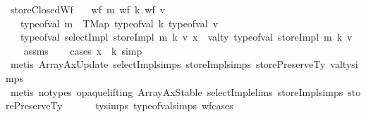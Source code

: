 \begin{isabellebody}
\endisatagproof
{\isafoldproof}%
%
\isadelimproof
\isanewline
%
\endisadelimproof
\isanewline
{}\isamarkupfalse%
\ storeClosedWf{}{\isacharcolon}{\kern0pt}\isanewline
\ \ \ {\isachardoublequoteopen}wf\ m{\isachardoublequoteclose}\ {\isachardoublequoteopen}wf\ k{\isachardoublequoteclose}\ {\isachardoublequoteopen}wf\ v{\isachardoublequoteclose}\isanewline
\ \ \ {\isachardoublequoteopen}type{\isacharunderscore}{\kern0pt}of{\isacharunderscore}{\kern0pt}val\ m\ {\isacharequal}{\kern0pt}\ TMap\ {\isacharparenleft}{\kern0pt}type{\isacharunderscore}{\kern0pt}of{\isacharunderscore}{\kern0pt}val\ k{\isacharparenright}{\kern0pt}\ {\isacharparenleft}{\kern0pt}type{\isacharunderscore}{\kern0pt}of{\isacharunderscore}{\kern0pt}val\ v{\isacharparenright}{\kern0pt}{\isachardoublequoteclose}\isanewline
\ \ \ {\isachardoublequoteopen}type{\isacharunderscore}{\kern0pt}of{\isacharunderscore}{\kern0pt}val\ {\isacharparenleft}{\kern0pt}selectImpl\ {\isacharparenleft}{\kern0pt}storeImpl\ m\ k\ v{\isacharparenright}{\kern0pt}\ x{\isacharparenright}{\kern0pt}\ {\isacharequal}{\kern0pt}\ val{\isacharunderscore}{\kern0pt}ty\ {\isacharparenleft}{\kern0pt}type{\isacharunderscore}{\kern0pt}of{\isacharunderscore}{\kern0pt}val\ {\isacharparenleft}{\kern0pt}storeImpl\ m\ k\ v{\isacharparenright}{\kern0pt}{\isacharparenright}{\kern0pt}{\isachardoublequoteclose}\isanewline
%
\isadelimproof
\ \ %
\endisadelimproof
%
\isatagproof
{}\isamarkupfalse%
\ assms\isanewline
\ \ \isamarkupfalse%
\ {\isacharparenleft}{\kern0pt}cases\ {\isachardoublequoteopen}x\ {\isacharequal}{\kern0pt}\ k{\isachardoublequoteclose}{\isacharsemicolon}{\kern0pt}\ simp{\isacharparenright}{\kern0pt}\isanewline
\ \ \ \isamarkupfalse%
\ {\isacharparenleft}{\kern0pt}metis\ ArrayAxUpdate\ selectImpl{\isachardot}{\kern0pt}simps\ storeImpl{\isachardot}{\kern0pt}simps\ storePreserveTy\ val{\isacharunderscore}{\kern0pt}ty{\isachardot}{\kern0pt}simps{\isacharparenleft}{\kern0pt}{}{\isacharparenright}{\kern0pt}{\isacharparenright}{\kern0pt}\isanewline
\ \ \isamarkupfalse%
\ {\isacharparenleft}{\kern0pt}metis\ {\isacharparenleft}{\kern0pt}no{\isacharunderscore}{\kern0pt}types{\isacharcomma}{\kern0pt}\ opaque{\isacharunderscore}{\kern0pt}lifting{\isacharparenright}{\kern0pt}\ ArrayAxStable\ selectImpl{\isachardot}{\kern0pt}elims\ storeImpl{\isachardot}{\kern0pt}simps\ storePreserveTy\isanewline
\ \ \ \ \ \ ty{\isachardot}{\kern0pt}simps{\isacharparenleft}{\kern0pt}{}{}{\isacharcomma}{\kern0pt}{}{}{\isacharparenright}{\kern0pt}\ type{\isacharunderscore}{\kern0pt}of{\isacharunderscore}{\kern0pt}val{\isachardot}{\kern0pt}simps{\isacharparenleft}{\kern0pt}{}{\isacharcomma}{\kern0pt}{}{\isacharparenright}{\kern0pt}\ wf{\isachardot}{\kern0pt}cases{\isacharparenright}{\kern0pt}%

\end{isabellebody}
